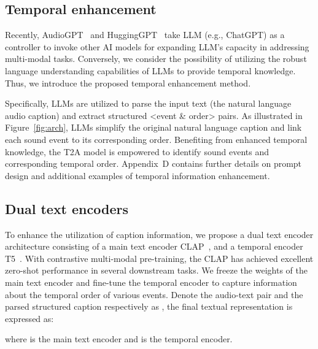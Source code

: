 \documentclass{article}
\begin{document}
\subsection{Temporal enhancement}
Recently, AudioGPT~\cite{huang2023audiogpt} and HuggingGPT~\cite{shen2023hugginggpt} take LLM (e.g., ChatGPT) as a controller to invoke other AI models for expanding LLM's capacity in addressing multi-modal tasks. Conversely, we consider the possibility of utilizing the robust language understanding capabilities of LLMs to provide temporal knowledge. Thus, we introduce the proposed temporal enhancement method.

Specifically, LLMs are utilized to parse the input text (the natural language audio caption) and extract structured <event \& order> pairs. As illustrated in Figure~\ref{fig:arch}, LLMs simplify the original natural language caption and link each sound event to its corresponding order. Benefiting from enhanced temporal knowledge, the T2A model is empowered to identify sound events and corresponding temporal order. Appendix~D contains further details on prompt design and additional examples of temporal information enhancement.

\subsection{Dual text encoders}
To enhance the utilization of caption information, we propose a dual text encoder architecture consisting of a main text encoder CLAP~\cite{elizalde2022clap}, and a temporal encoder T5~\cite{raffel2020exploring}. With contrastive multi-modal pre-training, the CLAP has achieved excellent zero-shot performance in several downstream tasks. We freeze the weights of the main text encoder and fine-tune the temporal encoder to capture information about the temporal order of various events. 
Denote the audio-text pair and the parsed structured caption respectively as , the final textual representation is expressed as:

where  is the main text encoder and  is the temporal encoder.
\end{document}
